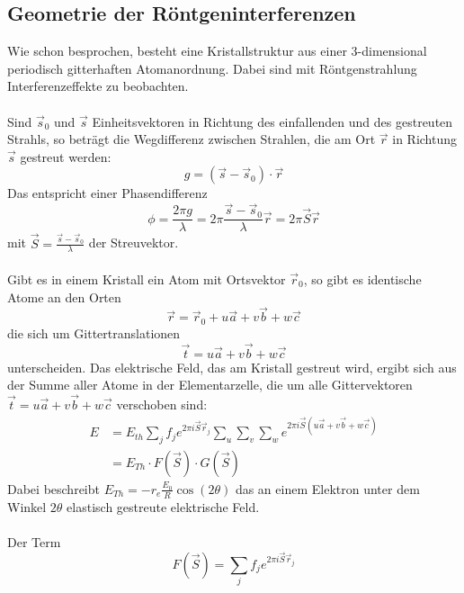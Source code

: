 \documentclass[a4paper,titlepage]{scrartcl}
\numberwithin{equation}{section}
\begin{document}
\subsection{Geometrie der Röntgeninterferenzen \cite{roentgeninterferenzen}}
Wie schon besprochen, besteht eine Kristallstruktur aus einer 3-dimensional periodisch gitterhaften Atomanordnung. Dabei sind mit Röntgenstrahlung Interferenzeffekte zu beobachten.\\ \\
Sind $\vec{s}_0$ und $\vec{s}$ Einheitsvektoren in Richtung des einfallenden und des gestreuten Strahls, so beträgt die Wegdifferenz zwischen Strahlen, die am Ort $\vec{r}$ in Richtung $\vec{s}$ gestreut werden:
\begin{equation*}
g=(\vec{s}-\vec{s}_0) \cdot \vec{r}
\end{equation*}
Das entspricht einer Phasendifferenz
\begin{equation*}
\phi=\frac{2 \pi g}{\lambda}=2\pi \frac{\vec{s}-\vec{s}_0}{\lambda} \vec{r}=2 \pi \vec{S} \vec{r}
\end{equation*}
mit $\vec{S}=\frac{\vec{s}-\vec{s}_0}{\lambda}$ der Streuvektor.\\\\
Gibt es in einem Kristall ein Atom mit Ortsvektor $\vec{r}_0$, so gibt es identische Atome an den Orten
\begin{equation*}
\vec{r}=\vec{r}_0+u\vec{a}+v\vec{b}+w\vec{c}
\end{equation*}
die sich um Gittertranslationen
\begin{equation*}
\vec{t}=u \vec{a}+v \vec{b} + w \vec{c}
\end{equation*}
unterscheiden. Das elektrische Feld, das am Kristall gestreut wird, ergibt sich aus der Summe aller Atome in der Elementarzelle, die um alle Gittervektoren $\vec{t}=u \vec{a} + v \vec{b} + w \vec{c}$ verschoben sind:
\begin{align*}
E&=E_{th} \sum_j f_j e^{2 \pi i \vec{S} \vec{r}_j} \sum_u \sum_v \sum_w e^{2 \pi i \vec{S} (u \vec{a} + v \vec{b} + w \vec{c})}\\
&=E_{Th} \cdot F(\vec{S}) \cdot G(\vec{S})
\end{align*}
Dabei beschreibt $E_{Th}=-r_e \frac{E_0}{R} \cos{(2 \theta)}$ das an einem Elektron unter dem Winkel $2 \theta$ elastisch gestreute elektrische Feld.\\ \\
Der Term
\begin{equation}
\label{eq:strukturfaktor}
F(\vec{S})=\sum_j f_j e^{2 \pi i \vec{S} \vec{r}_j}
\end{equation}
\end{document}
